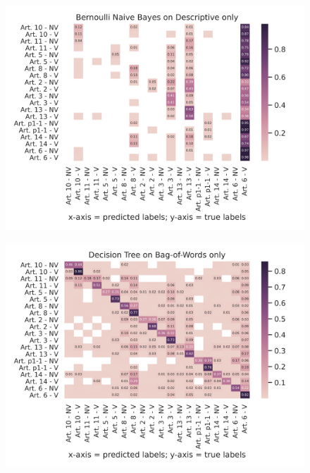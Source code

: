 \documentclass{article}
\begin{document}
\begin{figure}[!htb]
    \centering
    \includegraphics[scale=0.7]{data/analysis/cm/multiclass_cm_test_bernoulli_naive_bayes_descriptive_only.png}  
\end{figure}
\begin{figure}[!htb]
    \centering
    \includegraphics[scale=0.7]{data/analysis/cm/multiclass_cm_test_decision_tree_bag-of-words_only.png}  
\end{figure}
\end{document}
